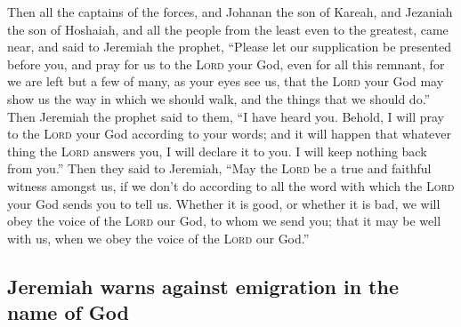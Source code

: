  Then all the captains of the forces, and Johanan the son
of Kareah, and Jezaniah the son of Hoshaiah, and all the people from the
least even to the greatest, came near,  and said to
Jeremiah the prophet, ``Please let our supplication be presented before
you, and pray for us to the \textsc{Lord} your God, even for all this
remnant, for we are left but a few of many, as your eyes see us,
 that the \textsc{Lord} your God may show us the way in
which we should walk, and the things that we should do.'' 
Then Jeremiah the prophet said to them, ``I have heard you. Behold, I
will pray to the \textsc{Lord} your God according to your words; and it
will happen that whatever thing the \textsc{Lord} answers you, I will
declare it to you. I will keep nothing back from you.'' 
Then they said to Jeremiah, ``May the \textsc{Lord} be a true and
faithful witness amongst us, if we don't do according to all the word
with which the \textsc{Lord} your God sends you to tell us.
 Whether it is good, or whether it is bad, we will obey
the voice of the \textsc{Lord} our God, to whom we send you; that it may
be well with us, when we obey the voice of the \textsc{Lord} our God.''

\hypertarget{jeremiah-warns-against-emigration-in-the-name-of-god}{%
\subsection{Jeremiah warns against emigration in the name of
God}\label{jeremiah-warns-against-emigration-in-the-name-of-god}}

